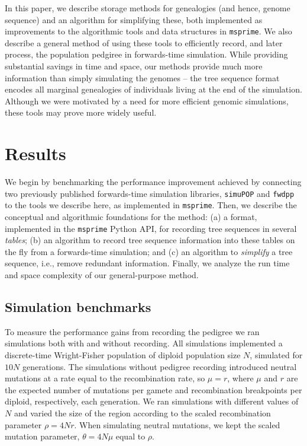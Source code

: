 \documentclass{article}
\newcommand{\simupop}{\texttt{simuPOP}}
\newcommand{\fwdpp}{\texttt{fwdpp}}
\newcommand{\msprime}{\texttt{msprime}}
\begin{document}
In this paper, we describe storage methods for genealogies
(and hence, genome sequence) and an algorithm for simplifying these,
both implemented as improvements to the algorithmic tools and data structures in \msprime{}.
We also describe a general method of using these tools to efficiently record,
and later process, the population pedgiree in forwards-time simulation.
While providing substantial savings in time and space, our methods provide much
more information than simply simulating the genomes -- the tree sequence format
encodes all marginal genealogies of individuals living at the end of the
simulation.
Although we were motivated by a need for more efficient genomic simulations,
these tools may prove more widely useful.


\section*{Results}


We begin by benchmarking the performance improvement achieved by connecting
two previously published forwards-time simulation libraries,
\simupop{} \citep{peng2005simupop} and \fwdpp{} \citep{fwdpp}
to the tools we describe here, as implemented in \msprime{}.
Then, we describe the conceptual and algorithmic foundations for the method:
(a) a format, implemented in the \msprime{} Python API,
for recording tree sequences in several \emph{tables};
(b) an algorithm to record tree sequence information into these tables on the fly
    from a forwards-time simulation;
and (c) an algorithm to \emph{simplify} a tree sequence, i.e., remove redundant information.
Finally, we analyze the run time and space complexity of our general-purpose method.


\subsection*{Simulation benchmarks}

To measure the performance gains from recording the pedigree we ran simulations both with and without recording.
All simulations implemented a discrete-time Wright-Fisher population of diploid
population size $N$, simulated for $10N$ generations.
The simulations without pedigree recording introduced neutral mutations at a rate
equal to the recombination rate,
so $\mu = r$, where $\mu$ and $r$ are the expected number of mutations per gamete and recombination breakpoints per
diploid,
respectively, each generation.
We ran simulations with different values of $N$ and varied the size of the region according to the scaled recombination
parameter $\rho = 4Nr$.  When simulating neutral mutations, we kept the scaled mutation parameter, $\theta = 4N\mu$
equal to $\rho$.
\end{document}
